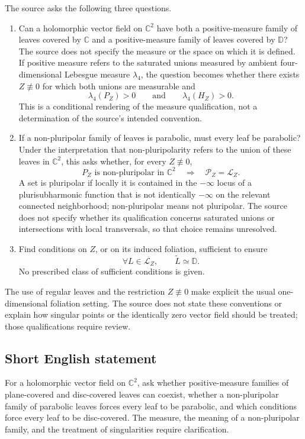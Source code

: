 \documentclass[11pt]{article}
\newcommand{\C}{\mathbb{C}}
\begin{document}
The source asks the following three questions.
\begin{enumerate}
\item[(i)] Can a holomorphic vector field on \(\C^2\) have both a positive-measure family of leaves covered by \(\C\) and a positive-measure family of leaves covered by \(\mathbb D\)? The source does not specify the measure or the space on which it is defined. If positive measure refers to the saturated unions measured by ambient four-dimensional Lebesgue measure \(\lambda_4\), the question becomes whether there exists \(Z\not\equiv0\) for which both unions are measurable and
\[
\lambda_4(P_Z)>0\qquad\text{and}\qquad\lambda_4(H_Z)>0.
\]
This is a conditional rendering of the measure qualification, not a determination of the source's intended convention.
\item[(ii)] If a non-pluripolar family of leaves is parabolic, must every leaf be parabolic? Under the interpretation that non-pluripolarity refers to the union of these leaves in \(\C^2\), this asks whether, for every \(Z\not\equiv0\),
\[
P_Z\text{ is non-pluripolar in }\C^2
\quad\Longrightarrow\quad
\mathcal P_Z=\mathcal L_Z.
\]
A set is pluripolar if locally it is contained in the \(-\infty\) locus of a plurisubharmonic function that is not identically \(-\infty\) on the relevant connected neighborhood; non-pluripolar means not pluripolar. The source does not specify whether its qualification concerns saturated unions or intersections with local transversals, so that choice remains unresolved.
\item[(iii)] Find conditions on \(Z\), or on its induced foliation, sufficient to ensure
\[
\forall L\in\mathcal L_Z,\qquad \widetilde L\simeq\mathbb D.
\]
No prescribed class of sufficient conditions is given.
\end{enumerate}
The use of regular leaves and the restriction \(Z\not\equiv0\) make explicit the usual one-dimensional foliation setting. The source does not state these conventions or explain how singular points or the identically zero vector field should be treated; those qualifications require review.
\subsection{Short English statement}
For a holomorphic vector field on \(\C^2\), ask whether positive-measure families of plane-covered and disc-covered leaves can coexist, whether a non-pluripolar family of parabolic leaves forces every leaf to be parabolic, and which conditions force every leaf to be disc-covered. The measure, the meaning of a non-pluripolar family, and the treatment of singularities require clarification.
\end{document}
